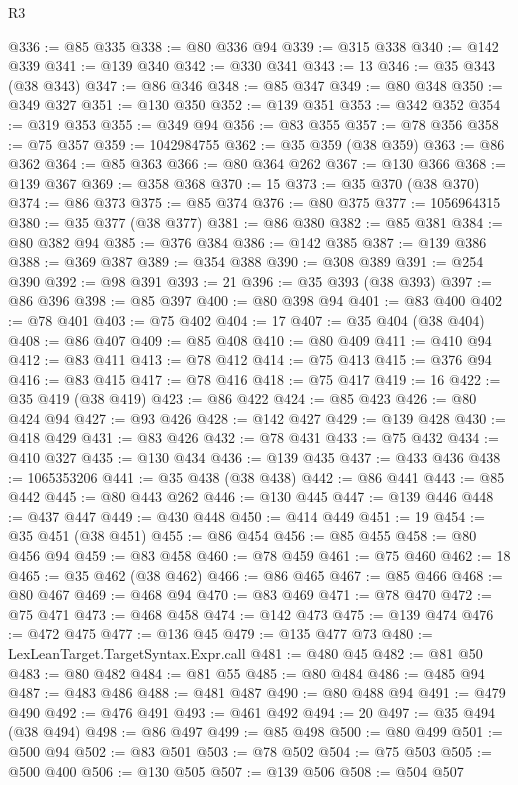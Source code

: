 \begin{lexlean}{R3}
\begin{coremodule}
@336 := @85 @335
@338 := @80 @336 @94
@339 := @315 @338
@340 := @142 @339
@341 := @139 @340
@342 := @330 @341
@343 := 13
@346 := @35 @343 (@38 @343)
@347 := @86 @346
@348 := @85 @347
@349 := @80 @348
@350 := @349 @327
@351 := @130 @350
@352 := @139 @351
@353 := @342 @352
@354 := @319 @353
@355 := @349 @94
@356 := @83 @355
@357 := @78 @356
@358 := @75 @357
@359 := 1042984755
@362 := @35 @359 (@38 @359)
@363 := @86 @362
@364 := @85 @363
@366 := @80 @364 @262
@367 := @130 @366
@368 := @139 @367
@369 := @358 @368
@370 := 15
@373 := @35 @370 (@38 @370)
@374 := @86 @373
@375 := @85 @374
@376 := @80 @375
@377 := 1056964315
@380 := @35 @377 (@38 @377)
@381 := @86 @380
@382 := @85 @381
@384 := @80 @382 @94
@385 := @376 @384
@386 := @142 @385
@387 := @139 @386
@388 := @369 @387
@389 := @354 @388
@390 := @308 @389
@391 := @254 @390
@392 := @98 @391
@393 := 21
@396 := @35 @393 (@38 @393)
@397 := @86 @396
@398 := @85 @397
@400 := @80 @398 @94
@401 := @83 @400
@402 := @78 @401
@403 := @75 @402
@404 := 17
@407 := @35 @404 (@38 @404)
@408 := @86 @407
@409 := @85 @408
@410 := @80 @409
@411 := @410 @94
@412 := @83 @411
@413 := @78 @412
@414 := @75 @413
@415 := @376 @94
@416 := @83 @415
@417 := @78 @416
@418 := @75 @417
@419 := 16
@422 := @35 @419 (@38 @419)
@423 := @86 @422
@424 := @85 @423
@426 := @80 @424 @94
@427 := @93 @426
@428 := @142 @427
@429 := @139 @428
@430 := @418 @429
@431 := @83 @426
@432 := @78 @431
@433 := @75 @432
@434 := @410 @327
@435 := @130 @434
@436 := @139 @435
@437 := @433 @436
@438 := 1065353206
@441 := @35 @438 (@38 @438)
@442 := @86 @441
@443 := @85 @442
@445 := @80 @443 @262
@446 := @130 @445
@447 := @139 @446
@448 := @437 @447
@449 := @430 @448
@450 := @414 @449
@451 := 19
@454 := @35 @451 (@38 @451)
@455 := @86 @454
@456 := @85 @455
@458 := @80 @456 @94
@459 := @83 @458
@460 := @78 @459
@461 := @75 @460
@462 := 18
@465 := @35 @462 (@38 @462)
@466 := @86 @465
@467 := @85 @466
@468 := @80 @467
@469 := @468 @94
@470 := @83 @469
@471 := @78 @470
@472 := @75 @471
@473 := @468 @458
@474 := @142 @473
@475 := @139 @474
@476 := @472 @475
@477 := @136 @45
@479 := @135 @477 @73
@480 := LexLeanTarget.TargetSyntax.Expr.call
@481 := @480 @45
@482 := @81 @50
@483 := @80 @482
@484 := @81 @55
@485 := @80 @484
@486 := @485 @94
@487 := @483 @486
@488 := @481 @487
@490 := @80 @488 @94
@491 := @479 @490
@492 := @476 @491
@493 := @461 @492
@494 := 20
@497 := @35 @494 (@38 @494)
@498 := @86 @497
@499 := @85 @498
@500 := @80 @499
@501 := @500 @94
@502 := @83 @501
@503 := @78 @502
@504 := @75 @503
@505 := @500 @400
@506 := @130 @505
@507 := @139 @506
@508 := @504 @507

\end{coremodule}
\end{lexlean}
